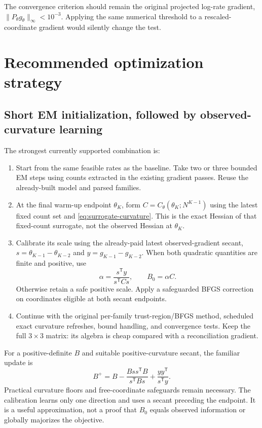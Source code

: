 \documentclass[11pt]{article}
\newcommand{\tr}{\mathsf T}
\begin{document}
The convergence criterion should remain the original projected log-rate
gradient, $\|P_\theta g_\theta\|_\infty<10^{-3}$. Applying the same numerical
threshold to a rescaled-coordinate gradient would silently change the test.

\section{Recommended optimization strategy}

\subsection{Short EM initialization, followed by observed-curvature learning}

The strongest currently supported combination is:
\begin{enumerate}
 \item Start from the same feasible rates as the baseline. Take two or three
       bounded EM steps using counts extracted in the existing gradient passes.
       Reuse the already-built model and parsed families.
 \item At the final warm-up endpoint $\theta_K$, form
       $C=C_\theta(\theta_K;N^{K-1})$ using the latest fixed count set and
       \eqref{eq:surrogate-curvature}. This is the exact Hessian of that
       fixed-count surrogate, not the observed Hessian at $\theta_K$.
 \item Calibrate its scale using the already-paid latest observed-gradient
       secant, $s=\theta_{K-1}-\theta_{K-2}$ and
       $y=g_{K-1}-g_{K-2}$. When both quadratic quantities are finite and
       positive, use
       \[
        \alpha=\frac{s^\tr y}{s^\tr Cs},\qquad B_0=\alpha C.
       \]
       Otherwise retain a safe positive scale. Apply a safeguarded BFGS
       correction on coordinates eligible at both secant endpoints.
 \item Continue with the original per-family trust-region/BFGS method,
       scheduled exact curvature refreshes, bound handling, and convergence
       tests. Keep the full $3\times3$ matrix: its algebra is cheap compared
       with a reconciliation gradient.
\end{enumerate}

For a positive-definite $B$ and suitable positive-curvature secant, the familiar
update is
\[
 B^+=B-\frac{Bss^\tr B}{s^\tr Bs}+\frac{yy^\tr}{s^\tr y}.
\]
Practical curvature floors and free-coordinate safeguards remain necessary.
The calibration learns only one direction and uses a secant preceding the
endpoint. It is a useful approximation, not a proof that $B_0$ equals observed
information or globally majorizes the objective.
\end{document}
